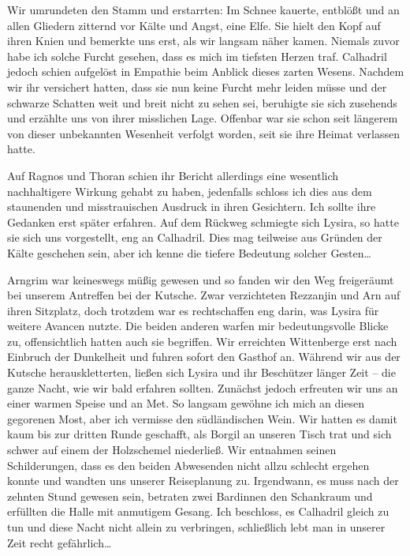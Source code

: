   
Wir umrundeten den Stamm und erstarrten: Im Schnee kauerte, entblößt und an allen Gliedern zitternd vor Kälte und Angst, eine Elfe. Sie hielt den Kopf auf ihren Knien und bemerkte uns erst, als wir langsam näher kamen. Niemals zuvor habe ich solche Furcht gesehen, dass es mich im tiefsten Herzen traf. Calhadril jedoch schien aufgelöst in Empathie beim Anblick dieses zarten Wesens. Nachdem wir ihr versichert hatten, dass sie nun keine Furcht mehr leiden müsse und der schwarze Schatten weit und breit nicht zu sehen sei, beruhigte sie sich zusehends und erzählte uns von ihrer misslichen Lage. Offenbar war sie schon seit längerem von dieser unbekannten Wesenheit verfolgt worden, seit sie ihre Heimat verlassen hatte. 


Auf Ragnos und Thoran schien ihr Bericht allerdings eine wesentlich nachhaltigere Wirkung gehabt zu haben, jedenfalls schloss ich dies aus dem staunenden und misstrauischen Ausdruck in ihren Gesichtern. Ich sollte ihre Gedanken erst später erfahren. Auf dem Rückweg schmiegte sich Lysira, so hatte sie sich uns vorgestellt, eng an Calhadril. Dies mag teilweise aus Gründen der Kälte geschehen sein, aber ich kenne die tiefere Bedeutung solcher Gesten\dots


Arngrim war keineswegs müßig gewesen und so fanden wir den Weg freigeräumt bei unserem Antreffen bei der Kutsche. Zwar verzichteten Rezzanjin und Arn auf ihren Sitzplatz, doch trotzdem war es rechtschaffen eng darin, was Lysira für weitere Avancen nutzte. Die beiden anderen warfen mir bedeutungsvolle Blicke zu, offensichtlich hatten auch sie begriffen. Wir erreichten Wittenberge erst nach Einbruch der Dunkelheit und fuhren sofort den Gasthof an. Während wir aus der Kutsche herauskletterten, ließen sich Lysira und ihr Beschützer länger Zeit -- die ganze Nacht, wie wir bald erfahren sollten. Zunächst jedoch erfreuten wir uns an einer warmen Speise und an Met. So langsam gewöhne ich mich an diesen gegorenen Most, aber ich vermisse den südländischen Wein. Wir hatten es damit kaum bis zur dritten Runde geschafft, als Borgil an unseren Tisch trat und sich schwer auf einem der Holzschemel niederließ. Wir entnahmen seinen Schilderungen, dass es den beiden Abwesenden nicht allzu schlecht ergehen konnte und wandten uns unserer Reiseplanung zu. Irgendwann, es muss nach der zehnten Stund gewesen sein, betraten zwei Bardinnen den Schankraum und erfüllten die Halle mit anmutigem Gesang. Ich beschloss, es Calhadril gleich zu tun und diese Nacht nicht allein zu verbringen, schließlich lebt man in unserer Zeit recht gefährlich\dots


